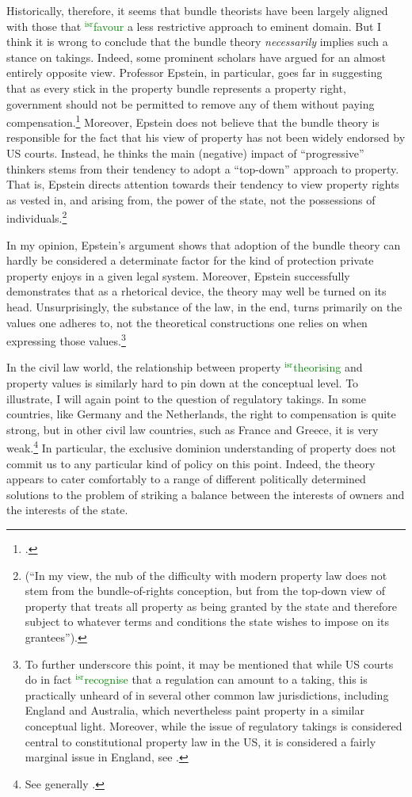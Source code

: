 \documentclass[12pt,a4paper]{book} %
\newcommand{\isr}[1]{\textcolor{green}{$^{\textrm{isr}}${#1}}}
\begin{document}
Historically, therefore, it seems that bundle theorists have been largely aligned with those that \isr{favour} a less restrictive approach to eminent domain. But I think it is wrong to conclude that the bundle theory {\it necessarily} implies such a stance on takings. Indeed, some prominent scholars have argued for an almost entirely opposite view. Professor Epstein, in particular, goes far in suggesting that as every stick in the property bundle represents a property right, government should not be permitted to remove any of them without paying compensation.\footcite[232-233]{epstein11} Moreover, Epstein does not believe that the bundle theory is responsible for the fact that his view of property has not been widely endorsed by US courts. Instead, he thinks the main (negative) impact of ``progressive'' thinkers stems from their tendency to adopt a ``top-down'' approach to property. That is, Epstein directs attention towards their tendency to view property rights as vested in, and arising from, the power of the state, not the possessions of individuals.\footnote{\cite[227-228]{epstein11} (``In my view, the nub of the difficulty with modern property law does not stem from the bundle-of-rights conception, but from the top-down view of property that treats all property as being granted by the state and therefore subject to whatever terms and conditions the state wishes to impose on its grantees'').} 

In my opinion, Epstein's argument shows that adoption of the bundle theory can hardly be considered a determinate factor for the kind of protection private property enjoys in a given legal system. Moreover, Epstein successfully demonstrates that as a rhetorical device, the theory may well be turned on its head. Unsurprisingly, the substance of the law, in the end, turns primarily on the values one adheres to, not the theoretical constructions one relies on when expressing those values.\footnote{To further underscore this point, it may be mentioned that while US courts do in fact \isr{recognise} that a regulation can amount to a taking, this is practically unheard of in several other common law jurisdictions, including England and Australia, which nevertheless paint property in a similar conceptual light. Moreover, while the issue of regulatory takings is considered central to constitutional property law in the US, it is considered a fairly marginal issue in England, see \cite{purdue10}.}

In the civil law world, the relationship between property \isr{theorising} and property values is similarly hard to pin down at the conceptual level. To illustrate, I will again point to the question of regulatory takings. In some countries, like Germany and the Netherlands, the right to compensation is quite strong, but in other civil law countries, such as France and Greece, it is very weak.\footnote{See generally \cite{alterman10}.} In particular, the exclusive dominion understanding of property does not commit us to any particular kind of policy on this point. Indeed, the theory appears to cater comfortably to a range of different politically determined solutions to the problem of striking a balance between the interests of owners and the interests of the state. 
\end{document}

